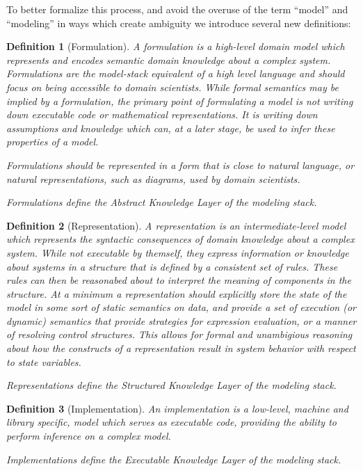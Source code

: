 \documentclass[11pt]{article}
\newtheorem{mydef}{Definition}
\begin{document}
To better formalize this process, and avoid the overuse of the term
``model'' and ``modeling'' in ways which create ambiguity we introduce
several new definitions:

\begin{mydef}[Formulation]
  A formulation is a high-level domain model which represents and
  encodes semantic domain knowledge about a complex system.
  Formulations are the model-stack equivalent of a high level
  language and should focus on being accessible to domain scientists.
  While formal semantics may be implied by a formulation, the primary
  point of formulating a model is not writing down executable code or
  mathematical representations.  It is
  writing down assumptions and knowledge which can, at a later stage,
  be used to infer these properties of a model.

  Formulations should be represented in a form that is close to
  natural language, or natural representations, such as diagrams, used
  by domain scientists.

  Formulations define the Abstract Knowledge Layer of the modeling stack.
 \end{mydef}

 \begin{mydef}[Representation]
   A representation is an intermediate-level model which
   represents the syntactic consequences of domain knowledge about a
   complex system.  While not executable by themself, they express
   information or knowledge about systems in a structure that is
   defined by a consistent set of rules.  These rules can then be 
   reasonabed about to interpret the meaning of components in the
   structure.  At a minimum a representation should explicitly store
   the state of the model in some sort of static semantics on data,
   and provide a set of execution (or dynamic) semantics that provide
   strategies for expression evaluation, or a manner of resolving
   control structures.  This allows for formal and unambigious
   reasoning about how the constructs of a representation result in
   system behavior with respect to state variables.

   Representations define the Structured Knowledge Layer of the
   modeling stack.
\end{mydef}

\begin{mydef}[Implementation]
  An implementation is a low-level, machine and library specific,
  model which serves as executable code, providing the ability to
  perform inference on a complex model.

  Implementations define the Executable Knowledge Layer of the
  modeling stack.
 \end{mydef}
\end{document}

